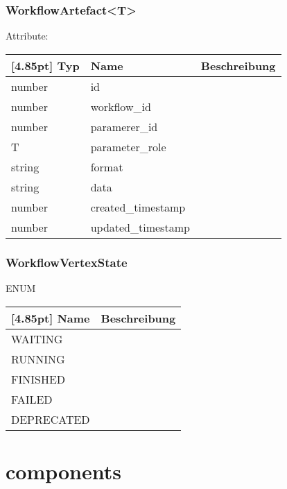     		\subsubsection{WorkflowArtefact<T>}
    		
    		Attribute:
                \begin{center}
                	\renewcommand{\arraystretch}{1.5}
    	            \setlength\tabcolsep{5pt}
                	\begin{tabularx}{\textwidth}{|l|l|X|}
                		\hline
                        \rowcolor[gray]{0.75}[4.85pt]
                	    Typ & Name & Beschreibung \\ \hline
                		number & id &  \\ \hline
                		number & workflow_id &  \\ \hline
                		number & paramerer_id &  \\ \hline
                		T & parameter_role &  \\ \hline
                		string & format &  \\ \hline
                		string & data &  \\ \hline
                		number & created_timestamp &  \\ \hline
                		number & updated_timestamp &  \\ \hline
                	\end{tabularx}
                \end{center}
                
    		\subsubsection{WorkflowVertexState}
    		
    		ENUM
                \begin{center}
                	\renewcommand{\arraystretch}{1.5}
    	            \setlength\tabcolsep{5pt}
                	\begin{tabularx}{\textwidth}{|l|X|}
                		\hline
                        \rowcolor[gray]{0.75}[4.85pt]
                	    Name & Beschreibung \\ \hline
                		WAITING &   \\ \hline
                		RUNNING &   \\ \hline
                		FINISHED  &  \\ \hline
                		FAILED  &  \\ \hline
                		DEPRECATED  &  \\ \hline
                	\end{tabularx}
                \end{center}
    
        \section{components}